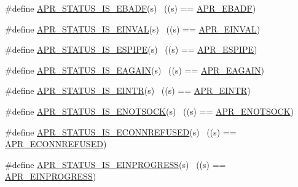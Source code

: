 \begin{DoxyCompactItemize}
\item 
\#define \hyperlink{group___a_p_r___s_t_a_t_u_s___i_s_ga8ac1ab146cc24d07099515446becfee7}{A\+P\+R\+\_\+\+S\+T\+A\+T\+U\+S\+\_\+\+I\+S\+\_\+\+E\+B\+A\+DF}(s)                ~((s) == \hyperlink{group___a_p_r___error_ga204df8a37a5c7fd6b2c74ea098fbac02}{A\+P\+R\+\_\+\+E\+B\+A\+DF})
\item 
\#define \hyperlink{group___a_p_r___s_t_a_t_u_s___i_s_ga329002c8d72aa3b8aa851e490ac39044}{A\+P\+R\+\_\+\+S\+T\+A\+T\+U\+S\+\_\+\+I\+S\+\_\+\+E\+I\+N\+V\+AL}(s)              ~((s) == \hyperlink{group___a_p_r___error_gae3ffc41994444e71ce522c036ca1d9a4}{A\+P\+R\+\_\+\+E\+I\+N\+V\+AL})
\item 
\#define \hyperlink{group___a_p_r___s_t_a_t_u_s___i_s_ga791b58edf9cd579681f03012affaf8b2}{A\+P\+R\+\_\+\+S\+T\+A\+T\+U\+S\+\_\+\+I\+S\+\_\+\+E\+S\+P\+I\+PE}(s)              ~((s) == \hyperlink{group___a_p_r___error_ga3be81035cd2da76fbc27c75496489359}{A\+P\+R\+\_\+\+E\+S\+P\+I\+PE})
\item 
\#define \hyperlink{group___a_p_r___s_t_a_t_u_s___i_s_ga56aa0a70756b5e83bc9d90f920527be4}{A\+P\+R\+\_\+\+S\+T\+A\+T\+U\+S\+\_\+\+I\+S\+\_\+\+E\+A\+G\+A\+IN}(s)              ~((s) == \hyperlink{group___a_p_r___error_ga0b2a5ebb819de5ce93d326939b586578}{A\+P\+R\+\_\+\+E\+A\+G\+A\+IN})
\item 
\#define \hyperlink{group___a_p_r___s_t_a_t_u_s___i_s_gae626ecee1818f43bd50531ab2b81dfab}{A\+P\+R\+\_\+\+S\+T\+A\+T\+U\+S\+\_\+\+I\+S\+\_\+\+E\+I\+N\+TR}(s)                ~((s) == \hyperlink{group___a_p_r___error_gaee1ce306c0ebf1701b34172310aa1bd5}{A\+P\+R\+\_\+\+E\+I\+N\+TR})
\item 
\#define \hyperlink{group___a_p_r___s_t_a_t_u_s___i_s_gab977261717e4119cf6d649592a33436a}{A\+P\+R\+\_\+\+S\+T\+A\+T\+U\+S\+\_\+\+I\+S\+\_\+\+E\+N\+O\+T\+S\+O\+CK}(s)          ~((s) == \hyperlink{group___a_p_r___error_gad456312527050c661dc19a8f17a0f0ef}{A\+P\+R\+\_\+\+E\+N\+O\+T\+S\+O\+CK})
\item 
\#define \hyperlink{group___a_p_r___s_t_a_t_u_s___i_s_gad261d29d9579a5bbc76fadc03e53f816}{A\+P\+R\+\_\+\+S\+T\+A\+T\+U\+S\+\_\+\+I\+S\+\_\+\+E\+C\+O\+N\+N\+R\+E\+F\+U\+S\+ED}(s)  ~((s) == \hyperlink{group___a_p_r___error_ga1b4d1d847bebdfc48af343bc2486ecb8}{A\+P\+R\+\_\+\+E\+C\+O\+N\+N\+R\+E\+F\+U\+S\+ED})
\item 
\#define \hyperlink{group___a_p_r___s_t_a_t_u_s___i_s_ga30122cce19f6c245f9491b95d0c66777}{A\+P\+R\+\_\+\+S\+T\+A\+T\+U\+S\+\_\+\+I\+S\+\_\+\+E\+I\+N\+P\+R\+O\+G\+R\+E\+SS}(s)    ~((s) == \hyperlink{group___a_p_r___error_ga5c311361f4f68f289c90f3cdfd77eb79}{A\+P\+R\+\_\+\+E\+I\+N\+P\+R\+O\+G\+R\+E\+SS})

\end{DoxyCompactItemize}
